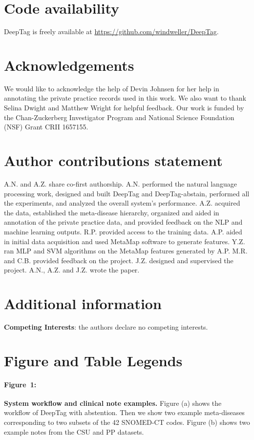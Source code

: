 \documentclass{article}[11pt,oneside]
\begin{document}
\section*{Code availability}
DeepTag is freely available at \url{https://github.com/windweller/DeepTag}.

\section*{Acknowledgements}

We would like to acknowledge the help of Devin Johnsen for her help in annotating the private practice records used in this work. We also want to thank Selina Dwight and Matthew Wright for helpful feedback. 
Our work is funded by the Chan-Zuckerberg Investigator Program and  National Science Foundation (NSF) Grant CRII 1657155.

\section*{Author contributions statement}

A.N. and A.Z. share co-first authorship. A.N. performed the natural language processing work, designed and built DeepTag and DeepTag-abstain, performed all the experiments, and analyzed the overall system's performance.  A.Z. acquired the data, established the meta-disease hierarchy, organized and aided in annotation of the private practice data, and provided feedback on the NLP and machine learning outputs. R.P. provided access to the training data. A.P. aided in initial data acquisition and used MetaMap software to generate features. Y.Z. ran MLP and SVM algorithms on the MetaMap features generated by A.P. M.R. and C.B. provided feedback on the project. J.Z. designed and supervised the project. A.N., A.Z. and J.Z. wrote the paper.

\section*{Additional information}
\textbf{Competing Interests}: the authors declare no competing interests.



\section*{Figure and Table Legends}

\paragraph{Figure~1:} {\bf System workflow and clinical note examples.} Figure (a) shows  the workflow of DeepTag  with abstention. Then we show two example meta-diseases corresponding to two subsets of the 42 SNOMED-CT codes. Figure (b) shows two example notes from the CSU and PP datasets. 
\end{document}
